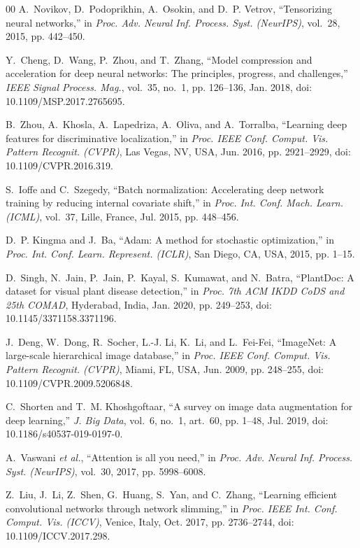 \documentclass[journal]{IEEEtran}
\begin{document}
\begin{thebibliography}{00}
A.~Novikov, D.~Podoprikhin, A.~Osokin, and D.~P. Vetrov, ``Tensorizing neural networks,'' in \textit{Proc. Adv. Neural Inf. Process. Syst. (NeurIPS)}, vol.~28, 2015, pp. 442--450.

Y.~Cheng, D.~Wang, P.~Zhou, and T.~Zhang, ``Model compression and acceleration for deep neural networks: The principles, progress, and challenges,'' \textit{IEEE Signal Process. Mag.}, vol.~35, no.~1, pp. 126--136, Jan. 2018, doi: 10.1109/MSP.2017.2765695.

B.~Zhou, A.~Khosla, A.~Lapedriza, A.~Oliva, and A.~Torralba, ``Learning deep features for discriminative localization,'' in \textit{Proc. IEEE Conf. Comput. Vis. Pattern Recognit. (CVPR)}, Las Vegas, NV, USA, Jun. 2016, pp. 2921--2929, doi: 10.1109/CVPR.2016.319.

S.~Ioffe and C.~Szegedy, ``Batch normalization: Accelerating deep network training by reducing internal covariate shift,'' in \textit{Proc. Int. Conf. Mach. Learn. (ICML)}, vol.~37, Lille, France, Jul. 2015, pp. 448--456.

D.~P. Kingma and J.~Ba, ``Adam: A method for stochastic optimization,'' in \textit{Proc. Int. Conf. Learn. Represent. (ICLR)}, San Diego, CA, USA, 2015, pp. 1--15.

D.~Singh, N.~Jain, P.~Jain, P.~Kayal, S.~Kumawat, and N.~Batra, ``PlantDoc: A dataset for visual plant disease detection,'' in \textit{Proc. 7th ACM IKDD CoDS and 25th COMAD}, Hyderabad, India, Jan. 2020, pp. 249--253, doi: 10.1145/3371158.3371196.

J.~Deng, W.~Dong, R.~Socher, L.-J. Li, K.~Li, and L.~Fei-Fei, ``ImageNet: A large-scale hierarchical image database,'' in \textit{Proc. IEEE Conf. Comput. Vis. Pattern Recognit. (CVPR)}, Miami, FL, USA, Jun. 2009, pp. 248--255, doi: 10.1109/CVPR.2009.5206848.

C.~Shorten and T.~M. Khoshgoftaar, ``A survey on image data augmentation for deep learning,'' \textit{J. Big Data}, vol.~6, no.~1, art.~60, pp. 1--48, Jul. 2019, doi: 10.1186/s40537-019-0197-0.

A.~Vaswani \textit{et al.}, ``Attention is all you need,'' in \textit{Proc. Adv. Neural Inf. Process. Syst. (NeurIPS)}, vol.~30, 2017, pp. 5998--6008.

Z.~Liu, J.~Li, Z.~Shen, G.~Huang, S.~Yan, and C.~Zhang, ``Learning efficient convolutional networks through network slimming,'' in \textit{Proc. IEEE Int. Conf. Comput. Vis. (ICCV)}, Venice, Italy, Oct. 2017, pp. 2736--2744, doi: 10.1109/ICCV.2017.298.


\end{thebibliography}
\end{document}
